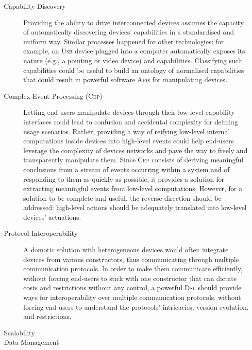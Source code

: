 \begin{description}
	\item[Capability Discovery] Providing the ability to drive interconnected devices assumes the capacity of automatically discovering devices' capabilities in a standardised and uniform way. Similar processes happened for other technologies: for example, an \textsc{Usb} device plugged into a computer automatically exposes its nature (e.g., a pointing or video device) and capabilities. Classifying such capabilities could be useful to build an ontology of normalised capabilities that could result in powerful software \textsc{Api}s for manipulating devices. 
		
	\item[Complex Event Processing (\textsc{Cep})] Letting end-users manipulate devices through their low-level capability interfaces could lead to confusion and accidental complexity for defining usage scenarios. Rather, providing a way of reifying low-level internal computations inside devices into high-level events could help end-users leverage the complexity of devices networks and pave the way to freely and transparently manipulate them. Since \textsc{Cep} consists of deriving meaningful conclusions from a stream of events occurring within a system and of responding to them as quickly as possible, it provides a solution for extracting meaningful events from low-level computations. However, for a solution to be complete and useful, the reverse direction should be addressed: high-level actions should be adequately translated into low-level devices' actuations. 
		
	\item[Protocol Interoperability] A domotic solution with heterogeneous devices would often integrate devices from various constructors, thus communicating through multiple communication protocols. In order to make them communicate efficiently, without forcing end-users to stick with one constructor that can dictate costs and restrictions without any control, a powerful \textsc{Dsl} should provide ways for interoperability over multiple communication protocols, without forcing end-users to understand the protocols' intricacies, version evolution, and restrictions.
	
	\item[Scalability]
	
	\item[Data Management]  
	

\end{description}
